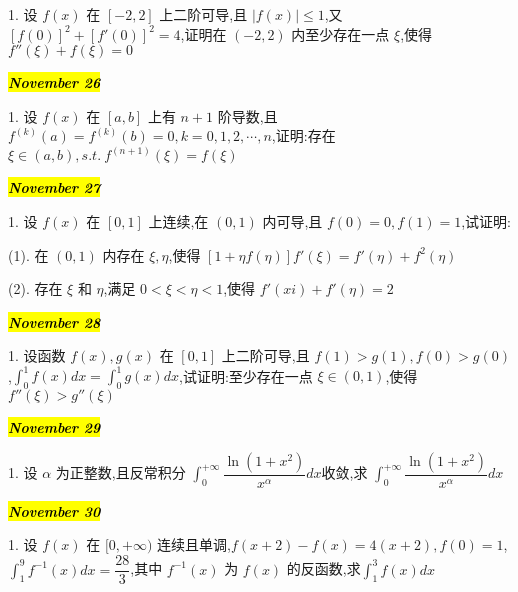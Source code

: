 1. 设 $f(x)$ 在 $[-2,2]$ 上二阶可导,且 $|f(x)|\leq 1$,又 $[f(0)]^{2}+[f'(0)]^{2}=4$,证明在 $(-2,2)$ 内至少存在一点 $\xi$,使得 $f''(\xi)+f(\xi)=0$
\begin{solution}
	
\end{solution}

\hl{\textbf{\textit{November 26}}}

1. 设 $f(x)$ 在 $[a,b]$ 上有 $n+1$ 阶导数,且 $f^{(k)}(a)=f^{(k)}(b)=0,k=0,1,2,\cdots,n$,证明:存在 $\xi\in(a,b),s.t.\ f^{(n+1)}(\xi)=f(\xi)$
\begin{solution}
	
\end{solution}

\hl{\textbf{\textit{November 27}}}

1. 设 $f(x)$ 在 $[0,1]$ 上连续,在 $(0,1)$ 内可导,且 $f(0)=0,f(1)=1$,试证明:

(1). 在 $(0,1)$ 内存在 $\xi,\eta$,使得 $[1+\eta f(\eta)] f'(\xi)= f'(\eta)+f^{2}(\eta)$

(2). 存在 $\xi$ 和 $\eta$,满足 $0<\xi<\eta<1$,使得 $f'(xi)+f'(\eta)=2$
\begin{solution}
	
\end{solution}

\hl{\textbf{\textit{November 28}}}

1. 设函数 $f(x),g(x)$ 在 $[0,1]$ 上二阶可导,且 $f(1)>g(1),f(0)>g(0)$,$\int_{0}^{1}f(x)dx=\int_{0}^{1}g(x)dx$,试证明:至少存在一点 $\xi\in(0,1)$,使得 $f''(\xi)>g''(\xi)$
\begin{solution}
	
\end{solution}

\hl{\textbf{\textit{November 29}}}

1. 设 $\alpha$ 为正整数,且反常积分 $\int_{0}^{+\infty}\dfrac{\ln(1+x^{2})}{x^{\alpha}}dx$收敛,求 $\int_{0}^{+\infty}\dfrac{\ln(1+x^{2})}{x^{\alpha}}dx$
\begin{solution}
	
\end{solution}

\hl{\textbf{\textit{November 30}}}

1. 设 $f(x)$ 在 $[0,+\infty)$ 连续且单调,$f(x+2)-f(x)=4(x+2),f(0)=1$,$\int_{1}^{9}f^{-1}(x)dx=\dfrac{28}{3}$,其中 $f^{-1}(x)$ 为 $f(x)$ 的反函数,求$\int_{1}^{3}f(x)dx$
\begin{solution}
	
\end{solution}
